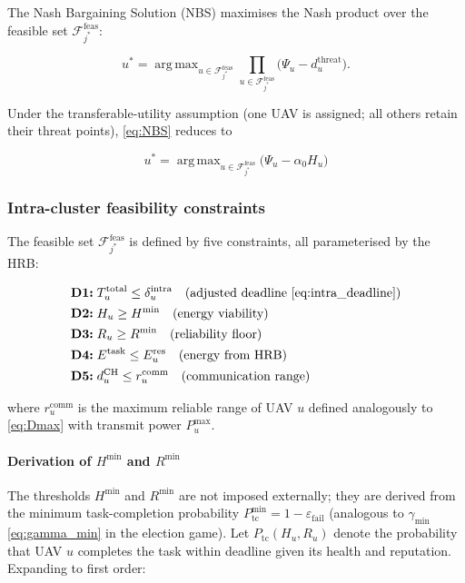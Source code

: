 \documentclass[journal]{IEEEtran}
\DeclareMathOperator*{\argmax}{arg\,max}
\begin{document}
\begin{IEEEproof}
The Nash Bargaining Solution (NBS) maximises the Nash
product over the feasible set
$\mathcal{F}_{j^{*}}^{\mathrm{feas}}$:

\begin{equation}\label{eq:NBS}
  u^{*}
  =\argmax_{u\in\mathcal{F}_{j^{*}}^{\mathrm{feas}}}
  \prod_{u\in\mathcal{F}_{j^{*}}^{\mathrm{feas}}}
  \bigl(\Psi_{u}-d_{u}^{\mathrm{threat}}\bigr).
\end{equation}

Under the transferable-utility assumption (one UAV is
assigned; all others retain their threat points),
\eqref{eq:NBS} reduces to

\begin{equation}\label{eq:u_star}
  u^{*}
  =\argmax_{u\in\mathcal{F}_{j^{*}}^{\mathrm{feas}}}
  \bigl(\Psi_{u}-\alpha_{0}H_{u}\bigr)
\end{equation}

\subsubsection{Intra-cluster feasibility constraints}

The feasible set $\mathcal{F}_{j^{*}}^{\mathrm{feas}}$ is
defined by five constraints, all parameterised by the HRB:

\begin{align}
  &\textbf{D1:}\;T_{u}^{\mathrm{total}}
    \leq\delta_{u}^{\mathrm{intra}}
    \quad(\text{adjusted deadline \eqref{eq:intra_deadline}})\label{eq:D1}\\
  &\textbf{D2:}\;H_{u}\geq H^{\min}
    \quad(\text{energy viability})\label{eq:D2}\\
  &\textbf{D3:}\;R_{u}\geq R^{\min}
    \quad(\text{reliability floor})\label{eq:D3}\\
  &\textbf{D4:}\;E^{\mathrm{task}}\leq E_{u}^{\mathrm{res}}
    \quad(\text{energy from HRB})\label{eq:D4}\\
  &\textbf{D5:}\;d_{u}^{\mathrm{CH}}\leq r_{u}^{\mathrm{comm}}
    \quad(\text{communication range})\label{eq:D5}
\end{align}

where $r_{u}^{\mathrm{comm}}$ is the maximum reliable
range of UAV $u$ defined analogously to \eqref{eq:Dmax}
with transmit power $P_{u}^{\max}$.

\paragraph{Derivation of $H^{\min}$ and $R^{\min}$}
The thresholds $H^{\min}$ and $R^{\min}$ are not imposed
externally; they are derived from the minimum
task-completion probability
$P_{\mathrm{tc}}^{\min}=1-\varepsilon_{\mathrm{fail}}$
(analogous to $\gamma_{\min}$ \eqref{eq:gamma_min} in the
election game).  Let $P_{\mathrm{tc}}(H_{u},R_{u})$ denote
the probability that UAV $u$ completes the task within
deadline given its health and reputation.  Expanding to
first order:


\end{IEEEproof}
\end{document}
